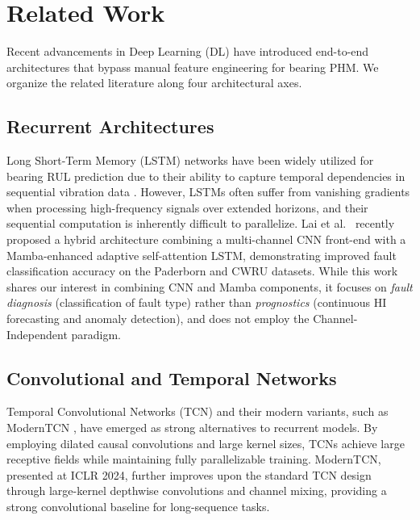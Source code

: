\documentclass{ieeeaccess}
\begin{document}
{%
\section{Related Work}
\label{sec:related_work}

Recent advancements in Deep Learning (DL) have introduced end-to-end architectures that bypass manual feature engineering for bearing PHM. We organize the related literature along four architectural axes.

\subsection{Recurrent Architectures}
Long Short-Term Memory (LSTM) networks have been widely utilized for bearing RUL prediction due to their ability to capture temporal dependencies in sequential vibration data \cite{wu2018remaining}. However, LSTMs often suffer from vanishing gradients when processing high-frequency signals over extended horizons, and their sequential computation is inherently difficult to parallelize. Lai et al.\ \cite{lai2025cnnmamba} recently proposed a hybrid architecture combining a multi-channel CNN front-end with a Mamba-enhanced adaptive self-attention LSTM, demonstrating improved fault classification accuracy on the Paderborn and CWRU datasets. While this work shares our interest in combining CNN and Mamba components, it focuses on \textit{fault diagnosis} (classification of fault type) rather than \textit{prognostics} (continuous HI forecasting and anomaly detection), and does not employ the Channel-Independent paradigm.

\subsection{Convolutional and Temporal Networks}
Temporal Convolutional Networks (TCN) \cite{bai2018tcn} and their modern variants, such as ModernTCN \cite{luo2024moderntcn}, have emerged as strong alternatives to recurrent models. By employing dilated causal convolutions and large kernel sizes, TCNs achieve large receptive fields while maintaining fully parallelizable training. ModernTCN, presented at ICLR 2024, further improves upon the standard TCN design through large-kernel depthwise convolutions and channel mixing, providing a strong convolutional baseline for long-sequence tasks.

}
\end{document}
